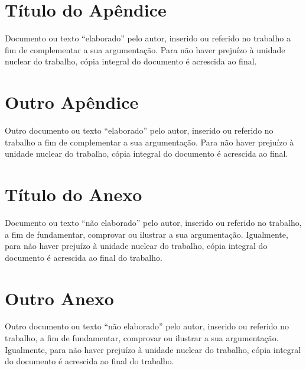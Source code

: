 \documentclass{unemat-tex}
\begin{document}


\postextual



\begin{apendicesenv}

\partapendices

\chapter{Título do Apêndice}

	Documento ou texto “elaborado” pelo autor, inserido ou referido no trabalho a fim de complementar a sua argumentação. Para	não haver prejuízo à unidade nuclear do	trabalho, cópia integral do documento é	acrescida ao final.
	
\chapter{Outro Apêndice}

	Outro documento ou texto “elaborado” pelo autor, inserido ou referido no trabalho a fim de complementar a sua argumentação. Para	não haver prejuízo à unidade nuclear do	trabalho, cópia integral do documento é	acrescida ao final.


\end{apendicesenv}


\begin{anexosenv}

\partanexos

\chapter{Título do Anexo}

	Documento ou texto “não elaborado”	pelo autor, inserido ou referido no trabalho, a fim de fundamentar, comprovar ou ilustrar a sua argumentação. Igualmente, para não haver prejuízo à unidade nuclear do trabalho, cópia integral do documento é acrescida ao final do trabalho.
	
\chapter{Outro Anexo}

	Outro documento ou texto “não elaborado”	pelo autor, inserido ou referido no trabalho, a fim de fundamentar, comprovar ou ilustrar a sua argumentação. Igualmente, para não haver prejuízo à unidade nuclear do trabalho, cópia integral do documento é acrescida ao final do trabalho.
	
\end{anexosenv}
\end{document}
